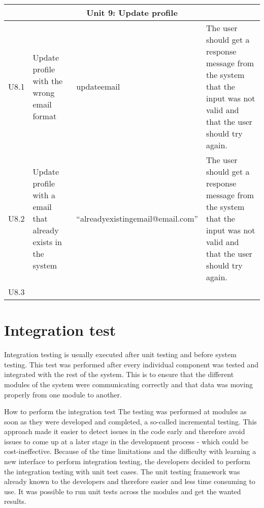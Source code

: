 {\begin{center}
\begin{longtable}{ | p{1.5cm} | p{6.5cm} | p{3cm} | p{6.5cm} |}
			\multicolumn{4}{c}{Unit 9: Update profile}	\\\hline			
			
			U8.1 & Update profile with the wrong email format  & updateemail  & The user should get a response message from the system that the input was not valid and that the user should try again.   \\ \hline			
			U8.2 & Update profile with a email that already exists in the system  & “alreadyexistingemail\newline @email.com”  & The user should get a response message from the system that the input was not valid and that the user should try again.    \\\hline						
			U8.3 &  &   &  \\ \hline	
			
		\end{longtable}
\end{center}



\section{Integration test}
\label{sec_integration_testing}

Integration testing is usually executed after unit testing and before system testing. This test was performed after every individual component was tested and integrated with the rest of the system. This is to ensure that the different modules of the system were communicating correctly and that data was moving properly from one module to another. \newline

How to perform the integration test\newline
The testing was performed at modules as soon as they were developed and completed, a so-called incremental testing. This approach made it easier to detect issues in the code early and therefore avoid issues to come up at a later stage in the development process - which could be cost-ineffective.
Because of the time limitations and the difficulty with learning a new interface to perform integration testing, the developers decided to perform the integration testing with unit test cases. The unit testing framework was already known to the developers and therefore easier and less time consuming to use. It was possible to run unit tests across the modules and get the wanted results.\newline

}
